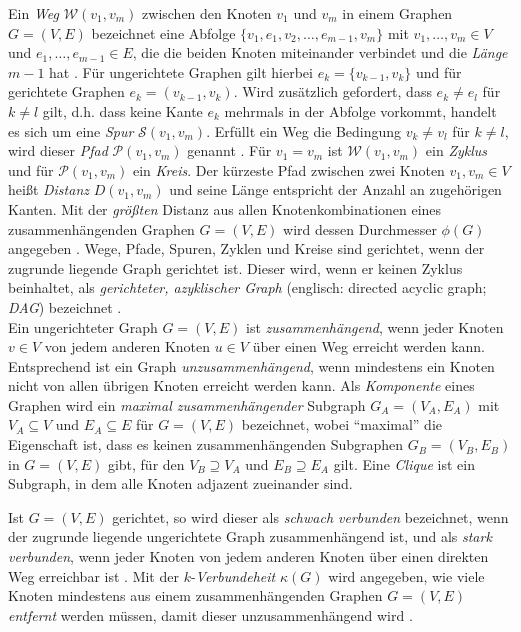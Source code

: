 \documentclass[12pt, a4paper]{report}\usepackage[]{graphicx}\usepackage[]{color}
\begin{document}
Ein \textit{Weg} $\mathcal{W}(v_1,v_m)$ zwischen den Knoten $v_1$ und $v_m$ in einem Graphen $G=(V,E)$ bezeichnet eine Abfolge $\{v_1, e_1, v_2,\dots,e_{m-1},v_m \}$ mit $v_1, \dots, v_m \in V$ und $e_1,\dots,e_{m-1} \in E$, die die beiden Knoten miteinander verbindet und die \textit{Länge} $m-1$ hat \cite{diestel2006graph}. Für ungerichtete Graphen gilt hierbei $e_k=\{v_{k-1}, v_k\}$ und für gerichtete Graphen $e_k=(v_{k-1}, v_k)$. Wird zusätzlich gefordert, dass $e_k \neq e_l$ für $k \neq l$ gilt, d.h. dass keine Kante $e_k$ mehrmals in der Abfolge vorkommt, handelt es sich um eine \textit{Spur} $\mathcal{S}(v_1,v_m)$. Erfüllt ein Weg die Bedingung $v_k \neq v_l$ für $k \neq l$, wird dieser \textit{Pfad} $\mathcal{P}(v_1,v_m)$ genannt \cite{brandes2005graphfunda}. Für $v_1 = v_m$ ist $\mathcal{W}(v_1,v_m)$ ein \textit{Zyklus} und für $\mathcal{P}(v_1,v_m)$ ein \textit{Kreis}. Der kürzeste Pfad zwischen zwei Knoten $v_1,v_m \in V$ heißt \textit{Distanz} $D(v_1,v_m)$ und seine Länge entspricht der Anzahl an zugehörigen Kanten. Mit der \textit{größten} Distanz aus allen Knotenkombinationen eines zusammenhängenden Graphen $G=(V,E)$ wird dessen Durchmesser $\phi(G)$ angegeben \cite{diestel2006graph}. Wege, Pfade, Spuren, Zyklen und Kreise sind gerichtet, wenn der zugrunde liegende Graph gerichtet ist. Dieser wird, wenn er keinen Zyklus beinhaltet, als \textit{gerichteter, azyklischer Graph}  (englisch: directed acyclic graph; \textit{DAG}) bezeichnet \cite{kolaczyk2009statistical}.\\

Ein ungerichteter Graph $G=(V,E)$ ist \textit{zusammenhängend}, wenn jeder Knoten $v \in V$ von jedem anderen Knoten $u \in V$ über einen Weg erreicht werden kann. Entsprechend ist ein Graph \textit{unzusammenhängend}, wenn mindestens ein Knoten nicht von allen übrigen Knoten erreicht werden kann. 
Als \textit{Komponente} eines Graphen wird ein \textit{maximal zusammenhängender} Subgraph $G_A=(V_A,E_A)$ mit $V_A \subseteq V$ und $E_A \subseteq E$ für $G=(V,E)$ bezeichnet, wobei "`maximal"' die Eigenschaft ist, dass es keinen zusammenhängenden Subgraphen  $G_B=(V_B, E_B)$ in $G=(V,E)$ gibt, für den $V_B \supseteq V_A$ und $E_B \supseteq E_A$ gilt. Eine \textit{Clique} ist ein Subgraph, in dem alle Knoten adjazent zueinander sind.
\begin{comment}
Ein maximal zusammenhängender Teilgraph $G_A=(V_A,E_A)$, für den $V_A \subseteq V$ und $E_A \subseteq E$ für $G=(V,E)$ gilt und es keinen zusammenhängenden Subgraphen  gibt, heißt \textit{Komponente}.
\end{comment} 
Ist $G=(V,E)$ gerichtet, so wird dieser als \textit{schwach verbunden} bezeichnet, wenn der zugrunde liegende ungerichtete Graph zusammenhängend ist, und als \textit{stark verbunden}, wenn jeder Knoten von jedem anderen Knoten über einen direkten Weg erreichbar ist \cite{brandes2005graphfunda}. Mit der $k$-\textit{Verbundeheit} $\kappa(G)$ wird angegeben, wie viele Knoten mindestens aus einem zusammenhängenden Graphen $G=(V,E)$ \textit{entfernt} werden müssen, damit dieser unzusammenhängend wird \cite{diestel2006graph}.\\
\end{document}
